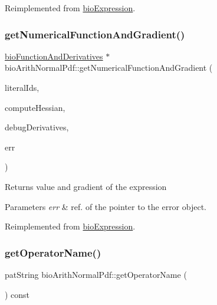 Reimplemented from \hyperlink{classbio_expression_a3e4b4dca58dbbc6f0e411b30eb3f60b4}{bio\+Expression}.

\mbox{\label{classbio_arith_normal_pdf_ab55fce91dd0740f61c7026426602e996}} 
\subsubsection{\texorpdfstring{get\+Numerical\+Function\+And\+Gradient()}{getNumericalFunctionAndGradient()}}
{\footnotesize\ttfamily \hyperlink{classbio_function_and_derivatives}{bio\+Function\+And\+Derivatives} $\ast$ bio\+Arith\+Normal\+Pdf\+::get\+Numerical\+Function\+And\+Gradient (\begin{DoxyParamCaption}\item[{vector$<$ pat\+U\+Long $>$}]{literal\+Ids,  }\item[{pat\+Boolean}]{compute\+Hessian,  }\item[{pat\+Boolean}]{debug\+Derivatives,  }\item[{pat\+Error $\ast$\&}]{err }\end{DoxyParamCaption})\hspace{0.3cm}{\ttfamily [virtual]}}

\begin{DoxyReturn}{Returns}
value and gradient of the expression 
\end{DoxyReturn}

\begin{DoxyParams}{Parameters}
{\em err} & ref. of the pointer to the error object. \\
\hline
\end{DoxyParams}


Reimplemented from \hyperlink{classbio_expression_a91c81ce80c9e972c913b10f5f3c1ed13}{bio\+Expression}.

\mbox{\label{classbio_arith_normal_pdf_ae2ad20d8db8f935fa7de1f4a0fd3288e}} 
\subsubsection{\texorpdfstring{get\+Operator\+Name()}{getOperatorName()}}
{\footnotesize\ttfamily pat\+String bio\+Arith\+Normal\+Pdf\+::get\+Operator\+Name (\begin{DoxyParamCaption}{ }\end{DoxyParamCaption}) const\hspace{0.3cm}{\ttfamily [virtual]}}

